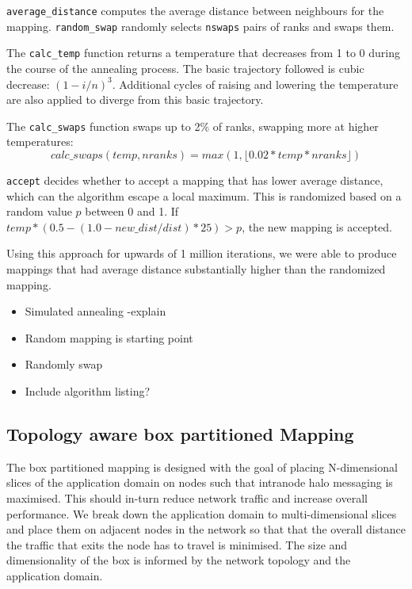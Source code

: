 \documentclass{acm_proc_article-sp}
\begin{document}
\texttt{average\_distance} computes the average distance between
neighbours for the mapping.  \texttt{random\_swap} randomly
selects \texttt{nswaps} pairs of ranks and swaps them.

The \texttt{calc\_temp} function returns a temperature that
decreases from 1 to 0 during the course of the annealing process.
The basic trajectory followed is cubic decrease: $(1 - i/n)^3$.
Additional cycles of raising and lowering the temperature are also
applied to diverge from this basic trajectory.

The \texttt{calc\_swaps} function swaps up to 2\% of ranks, swapping more at higher
temperatures:
$$calc\_swaps(temp, nranks) = max(1, \lfloor 0.02 * temp * nranks \rfloor)$$

\texttt{accept} decides whether to accept a mapping that has lower
average distance, which can the algorithm escape a local maximum.
This is randomized based on a random value $p$ between 0 and 1.
If $temp * (0.5 - (1.0 - new\_dist/dist) * 25) > p$, the new mapping
is accepted.

Using this approach for upwards of 1 million iterations,
we were able to produce mappings that had average distance substantially
higher than the randomized mapping. 

\begin{itemize}
  \item Simulated annealing -explain
  \item Random mapping is starting point
  \item Randomly swap
  \item Include algorithm listing?
\end{itemize}


\subsection{Topology aware box partitioned Mapping}

The box partitioned mapping is designed with the goal of placing N-dimensional slices of the application domain on nodes such that
intranode halo messaging is maximised. This should in-turn reduce network traffic and increase overall performance.
We break down the application domain to multi-dimensional slices and place them on adjacent nodes in the network so that that the
overall distance the traffic that exits the node has to travel is minimised. The size and dimensionality of the box is informed
by the network topology and the application domain.
\end{document}
